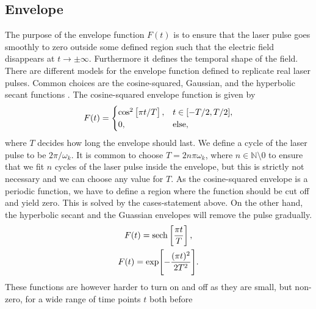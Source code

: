         \subsection{Envelope}
            The purpose of the envelope function $F(t)$ is to ensure that the
            laser pulse goes smoothly to zero outside some defined region such
            that the electric field disappears at $t \to \pm \infty$.
            Furthermore it defines the temporal shape of the field.
            There are different models for the envelope function defined to
            replicate real laser pulses.
            Common choices are the cosine-squared, Gaussian, and the hyperbolic
            secant functions \cite{joachain2012atoms}.
            The cosine-squared envelope function is given by
            \begin{gather}
                F(t) = \begin{cases}
                    \cos^2\left[ 
                        \pi t / T
                     \right], & t \in [-T / 2, T / 2], \\
                    0, & \text{else},
                \end{cases}
            \end{gather}
            where $T$ decides how long the envelope should last.
            We define a cycle of the laser pulse to be $2\pi/\omega_k$.
            It is common to choose $T = 2n\pi\omega_k$, where $n \in
            \mathbb{N}\setminus{0}$ to ensure that we fit $n$ cycles of the
            laser pulse inside the envelope, but this is strictly not necessary
            and we can choose any value for $T$.
            As the cosine-squared envelope is a periodic function, we have to
            define a region where the function should be cut off and yield zero.
            This is solved by the cases-statement above.
            On the other hand, the hyperbolic secant and the Guassian envelopes
            will remove the pulse gradually.
            \begin{gather}
                F(t) = \sech\brak{
                    \frac{\pi t}{T}
                }, \\
                F(t) = \exp[
                    -\frac{(\pi t)^2}{2T^2}
                ].
            \end{gather}
            These functions are however harder to turn on and off as they are
            small, but non-zero, for a wide range of time points $t$ both before
